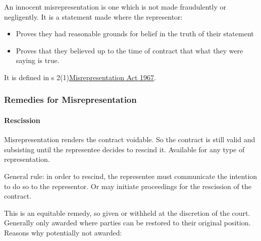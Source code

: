\documentclass[
]{article}
\providecommand{\tightlist}{%
  \setlength{\itemsep}{0pt}\setlength{\parskip}{0pt}}
\begin{document}
An innocent misrepresentation is one which is not made fraudulently or
negligently. It is a statement made where the representor:

\begin{itemize}
\tightlist
\item
  Proves they had reasonable grounds for belief in the truth of their
  statement
\item
  Proves that they believed up to the time of contract that what they
  were saying is true.
\end{itemize}

It is defined in s
2(1)\href{https://www.legislation.gov.uk/ukpga/1967/7}{Misrepresentation
Act 1967}.

\hypertarget{remedies-for-misrepresentation}{%
\subsubsection{Remedies for
Misrepresentation}\label{remedies-for-misrepresentation}}

\hypertarget{rescission}{%
\paragraph{Rescission}\label{rescission}}

Misrepresentation renders the contract voidable. So the contract is
still valid and subsisting until the representee decides to rescind it.
Available for any type of representation.

General rule: in order to rescind, the representee must communicate the
intention to do so to the representor. Or may initiate proceedings for
the rescission of the contract.

This is an equitable remedy, so given or withheld at the discretion of
the court. Generally only awarded where parties can be restored to their
original position. Reasons why potentially not awarded:
\end{document}
